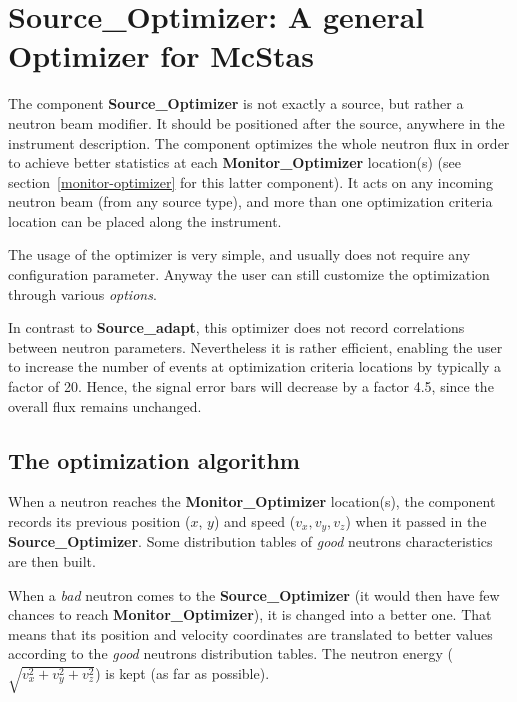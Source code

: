 \section{Source\_Optimizer: A general Optimizer for McStas}
\label{source-optimizer}

The component {\bf Source\_Optimizer} is not exactly a source,
but rather a neutron beam modifier.
It should be positioned after the source, anywhere in the instrument description.
The component  optimizes the whole neutron flux
in order to achieve better statistics at each {\bf Monitor\_Optimizer}
location(s) (see section~\ref{monitor-optimizer} for this latter
component). It acts on any incoming neutron beam (from any source
type), and more than one optimization criteria location can be placed
along the instrument.

The usage of the optimizer is very simple, and usually does not require
any configuration parameter. Anyway the user can still customize the
optimization through various {\it options}.

In contrast to {\bf Source\_adapt}, this optimizer does not
record correlations between neutron parameters.
Nevertheless it is rather efficient,
enabling the user to increase the number of events
at optimization criteria locations by typically a factor of 20.
Hence, the signal error bars will decrease by a factor 4.5,
since the overall flux remains unchanged.

\subsection{The optimization algorithm}

When a neutron reaches the {\bf Monitor\_Optimizer} location(s), the
component records its previous position ($x$, $y$) and speed ($v_x,
v_y, v_z$) when it passed in the {\bf Source\_Optimizer}. Some
distribution tables of {\it good} neutrons characteristics are then
built.

When a {\it bad} neutron comes to the {\bf Source\_Optimizer} (it would
then have few chances to reach {\bf Monitor\_Optimizer}), it is changed
into a better one. That means that its position and velocity coordinates
are translated to better values according to the {\it good} neutrons
distribution tables. The neutron energy
($\sqrt{v_x^2 + v_y^2 + v_z^2}$) is kept (as far as possible).

